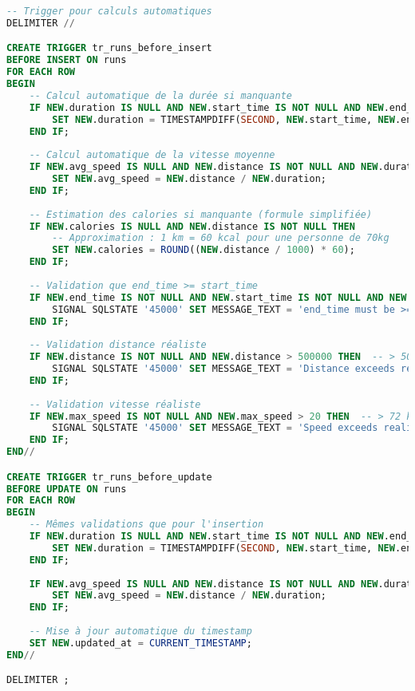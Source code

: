 \begin{lstlisting}[language=sql]
-- Trigger pour calculs automatiques
DELIMITER //

CREATE TRIGGER tr_runs_before_insert
BEFORE INSERT ON runs
FOR EACH ROW
BEGIN
    -- Calcul automatique de la durée si manquante
    IF NEW.duration IS NULL AND NEW.start_time IS NOT NULL AND NEW.end_time IS NOT NULL THEN
        SET NEW.duration = TIMESTAMPDIFF(SECOND, NEW.start_time, NEW.end_time);
    END IF;
    
    -- Calcul automatique de la vitesse moyenne
    IF NEW.avg_speed IS NULL AND NEW.distance IS NOT NULL AND NEW.duration IS NOT NULL AND NEW.duration > 0 THEN
        SET NEW.avg_speed = NEW.distance / NEW.duration;
    END IF;
    
    -- Estimation des calories si manquante (formule simplifiée)
    IF NEW.calories IS NULL AND NEW.distance IS NOT NULL THEN
        -- Approximation : 1 km = 60 kcal pour une personne de 70kg
        SET NEW.calories = ROUND((NEW.distance / 1000) * 60);
    END IF;
    
    -- Validation que end_time >= start_time
    IF NEW.end_time IS NOT NULL AND NEW.start_time IS NOT NULL AND NEW.end_time < NEW.start_time THEN
        SIGNAL SQLSTATE '45000' SET MESSAGE_TEXT = 'end_time must be >= start_time';
    END IF;
    
    -- Validation distance réaliste
    IF NEW.distance IS NOT NULL AND NEW.distance > 500000 THEN  -- > 500km
        SIGNAL SQLSTATE '45000' SET MESSAGE_TEXT = 'Distance exceeds realistic maximum (500km)';
    END IF;
    
    -- Validation vitesse réaliste
    IF NEW.max_speed IS NOT NULL AND NEW.max_speed > 20 THEN  -- > 72 km/h
        SIGNAL SQLSTATE '45000' SET MESSAGE_TEXT = 'Speed exceeds realistic maximum for running';
    END IF;
END//

CREATE TRIGGER tr_runs_before_update
BEFORE UPDATE ON runs
FOR EACH ROW
BEGIN
    -- Mêmes validations que pour l'insertion
    IF NEW.duration IS NULL AND NEW.start_time IS NOT NULL AND NEW.end_time IS NOT NULL THEN
        SET NEW.duration = TIMESTAMPDIFF(SECOND, NEW.start_time, NEW.end_time);
    END IF;
    
    IF NEW.avg_speed IS NULL AND NEW.distance IS NOT NULL AND NEW.duration IS NOT NULL AND NEW.duration > 0 THEN
        SET NEW.avg_speed = NEW.distance / NEW.duration;
    END IF;
    
    -- Mise à jour automatique du timestamp
    SET NEW.updated_at = CURRENT_TIMESTAMP;
END//

DELIMITER ;
\end{lstlisting}


